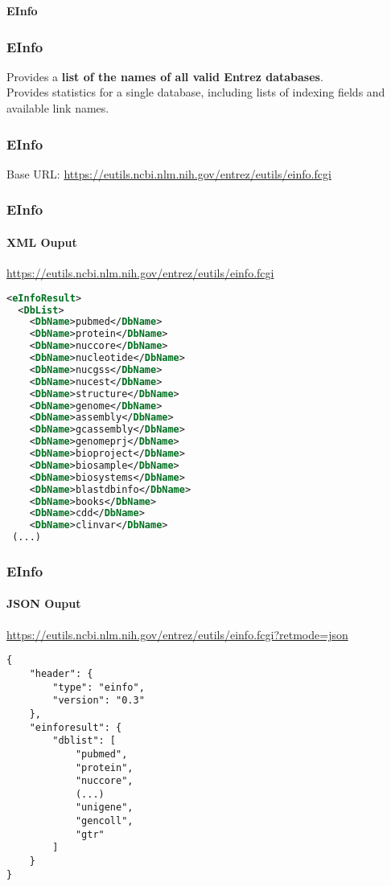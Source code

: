 \documentclass{beamer}
\newcommand{\centeredtitle}[1]{
\begin{center}
    \Huge{\bf{#1}}
\end{center}
}
\newcommand{\hugeslide}[1]{
\begin{frame}
\centeredtitle{#1}
\end{frame}
}
\begin{document}

\hugeslide{EInfo}

\begin{frame}[fragile]
\frametitle{EInfo}
\begin{center}
Provides a {\bf list of the names of all valid Entrez databases}.\\
Provides statistics for a single database, including lists of indexing fields and available link names.
\end{center}
\end{frame}

\begin{frame}[fragile]
\frametitle{EInfo}
Base URL:
\small
\url{https://eutils.ncbi.nlm.nih.gov/entrez/eutils/einfo.fcgi}
\end{frame}



\begin{frame}[fragile]
\frametitle{EInfo}
\framesubtitle{XML Ouput}

\url{https://eutils.ncbi.nlm.nih.gov/entrez/eutils/einfo.fcgi}

\small
\begin{lstlisting}[language=xml]
<eInfoResult>
  <DbList>
    <DbName>pubmed</DbName>
    <DbName>protein</DbName>
    <DbName>nuccore</DbName>
    <DbName>nucleotide</DbName>
    <DbName>nucgss</DbName>
    <DbName>nucest</DbName>
    <DbName>structure</DbName>
    <DbName>genome</DbName>
    <DbName>assembly</DbName>
    <DbName>gcassembly</DbName>
    <DbName>genomeprj</DbName>
    <DbName>bioproject</DbName>
    <DbName>biosample</DbName>
    <DbName>biosystems</DbName>
    <DbName>blastdbinfo</DbName>
    <DbName>books</DbName>
    <DbName>cdd</DbName>
    <DbName>clinvar</DbName>
 (...)
\end{lstlisting}
\end{frame}

\begin{frame}[fragile]
\frametitle{EInfo}
\framesubtitle{JSON Ouput}

\url{https://eutils.ncbi.nlm.nih.gov/entrez/eutils/einfo.fcgi?retmode=json}

\small
\begin{lstlisting}
{
    "header": {
        "type": "einfo",
        "version": "0.3"
    },
    "einforesult": {
        "dblist": [
            "pubmed",
            "protein",
            "nuccore",
       		(...)
            "unigene",
            "gencoll",
            "gtr"
        ]
    }
}
\end{lstlisting}
\end{frame}
\end{document}
